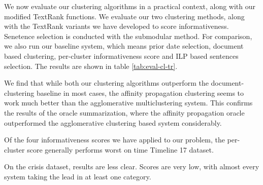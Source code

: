 \documentclass[a4paper,BCOR=10mm]{report}
\numberwithin{lemma}{chapter}
\numberwithin{definition}{chapter}
\begin{document}
%
%



We now evaluate our clustering algorithms in a practical context, along with our modified TextRank functions.
We evaluate our two clustering methods, along with the TextRank variants we have developed to score informativeness. Senetence selection is conducted with the submodular method. For comparison, we also run our baseline system, which means prior date selection, document based clustering, per-cluster informativeness score and ILP based sentences selection.
The results are shown in table \ref{tab:eval-cl-tr}.

We find that while both our clustering algorithms outperform the document-clustering baseline in most cases, the affinity propagation clustering seems to work much better than the agglomerative multiclustering system. This confirms the results of the oracle summarization, where the affinity propagation oracle outperformed the agglomerative clustering based system considerably.

Of the four informativeness scores we have applied to our problem, the per-cluster score generally performs worst on time Timeline 17 dataset.

On the crisis dataset, results are less clear.
Scores are very low, with almost every system taking the lead in at least one category.
\end{document}
